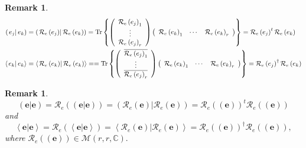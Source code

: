 \documentclass[aps,preprint]{revtex4}%
\newtheorem{remark}[theorem]{Remark}
\begin{document}
\begin{remark}%
\begin{align}
\left(  \left.  e_{j}\right\vert e_{k}\right)   &  =\left(  \left.
\mathcal{R}_{e}\left(  e_{j}\right)  \right\vert \mathcal{R}_{e}\left(
e_{k}\right)  \right)  =\operatorname{Tr}\left\{  \left(
\begin{array}
[c]{c}%
\mathcal{R}_{e}\left(  e_{j}\right)  _{1}\\
\vdots\\
\mathcal{R}_{e}\left(  e_{j}\right)  _{r}%
\end{array}
\right)  \left(
\begin{array}
[c]{ccc}%
\mathcal{R}_{e}\left(  e_{k}\right)  _{1} & \cdots & \mathcal{R}_{e}\left(
e_{k}\right)  _{r}%
\end{array}
\right)  \right\}  =\mathcal{R}_{e}\left(  e_{j}\right)  ^{t}\mathcal{R}%
_{e}\left(  e_{k}\right) \\
\left\langle \left.  e_{k}\right\vert e_{k}\right\rangle  &  =\left\langle
\left.  \mathcal{R}_{e}\left(  e_{k}\right)  \right\vert \mathcal{R}%
_{e}\left(  e_{k}\right)  \right\rangle ==\operatorname{Tr}\left\{  \left(
\begin{array}
[c]{c}%
\overline{\mathcal{R}_{e}\left(  e_{j}\right)  _{1}}\\
\vdots\\
\overline{\mathcal{R}_{e}\left(  e_{j}\right)  _{r}}%
\end{array}
\right)  \left(
\begin{array}
[c]{ccc}%
\mathcal{R}_{e}\left(  e_{k}\right)  _{1} & \cdots & \mathcal{R}_{e}\left(
e_{k}\right)  _{r}%
\end{array}
\right)  \right\}  =\mathcal{R}_{e}\left(  e_{j}\right)  ^{\dagger}%
\mathcal{R}_{e}\left(  e_{k}\right)
\end{align}

\end{remark}

\begin{remark}%
\begin{equation}
\left(  \left.  \mathbf{e}\right\vert \mathbf{e}\right)  =\mathcal{R}%
_{e}\left(  \left(  \left.  \mathbf{e}\right\vert \mathbf{e}\right)  \right)
=\left(  \left.  \mathcal{R}_{e}\left(  \mathbf{e}\right)  \right\vert
\mathcal{R}_{e}\left(  \mathbf{e}\right)  \right)  =\mathcal{R}_{e}\left(
\left(  \mathbf{e}\right)  \right)  ^{t}\mathcal{R}_{e}\left(  \left(
\mathbf{e}\right)  \right)
\end{equation}
and%
\begin{equation}
\left\langle \left.  \mathbf{e}\right\vert \mathbf{e}\right\rangle
=\mathcal{R}_{e}\left(  \left\langle \left.  \mathbf{e}\right\vert
\mathbf{e}\right\rangle \right)  =\left\langle \left.  \mathcal{R}_{e}\left(
\mathbf{e}\right)  \right\vert \mathcal{R}_{e}\left(  \mathbf{e}\right)
\right\rangle =\mathcal{R}_{e}\left(  \left(  \mathbf{e}\right)  \right)
^{\dagger}\mathcal{R}_{e}\left(  \left(  \mathbf{e}\right)  \right)  ,
\end{equation}
where $\mathcal{R}_{e}\left(  \left(  \mathbf{e}\right)  \right)
\in\mathcal{M}\left(  r,r,\mathbb{C}\right)  .$
\end{remark}
\end{document}
